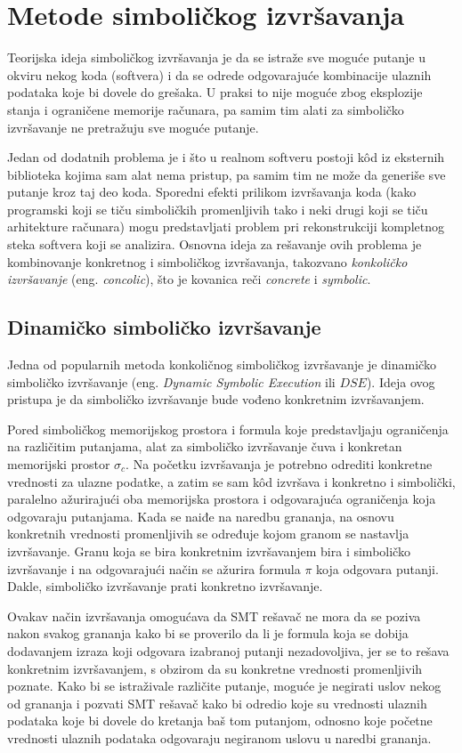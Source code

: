 \documentclass[12pt,oneside]{memoir}
\begin{document}
\section{Metode simboličkog izvršavanja}
Teorijska ideja simboličkog izvršavanja je da se istraže sve moguće putanje u okviru nekog koda (softvera) i da se odrede odgovarajuće kombinacije ulaznih podataka koje bi dovele do grešaka. U praksi to nije moguće zbog eksplozije stanja i ograničene memorije računara, pa samim tim alati za simboličko izvršavanje ne pretražuju sve moguće putanje. 

Jedan od dodatnih problema je i što u realnom softveru postoji k\^od iz eksternih biblioteka kojima sam alat nema pristup, pa samim tim ne može da generiše sve putanje kroz taj deo koda. Sporedni efekti prilikom izvršavanja koda (kako programski koji se tiču simboličkih promenljivih tako i neki drugi koji se tiču arhitekture računara) mogu predstavljati problem pri rekonstrukciji kompletnog steka softvera koji se analizira. Osnovna ideja za rešavanje ovih problema je kombinovanje konkretnog i simboličkog izvršavanja, takozvano \textit{konkoličko izvršavanje} (eng. \textit{concolic}), što je kovanica reči \textit{concrete} i \textit{symbolic}.

\subsection{Dinamičko simboličko izvršavanje}
Jedna od popularnih metoda konkoličnog simboličkog izvršavanje je dinamičko simboličko izvršavanje (eng. \textit{Dynamic Symbolic Execution} ili $DSE$). Ideja ovog pristupa je da simboličko izvršavanje bude vođeno konkretnim izvršavanjem. 

Pored simboličkog memorijskog prostora i formula koje predstavljaju ograničenja na različitim putanjama, alat za simboličko izvršavanje čuva i konkretan memorijski prostor $\sigma_c$. Na početku izvršavanja je potrebno odrediti konkretne vrednosti za ulazne podatke, a zatim se sam k\^od izvršava i konkretno i simbolički, paralelno ažurirajući oba memorijska prostora i odgovarajuća ograničenja koja odgovaraju putanjama. Kada se naiđe na naredbu grananja, na osnovu konkretnih vrednosti promenljivih se određuje kojom granom se nastavlja izvršavanje. Granu koja se bira konkretnim izvršavanjem bira i simboličko izvršavanje i na odgovarajući način se ažurira formula $\pi$ koja odgovara putanji. Dakle, simboličko izvršavanje prati konkretno izvršavanje. 

Ovakav način izvršavanja omogućava da SMT rešavač ne mora da se poziva nakon svakog grananja kako bi se proverilo da li je formula koja se dobija dodavanjem izraza koji odgovara izabranoj putanji nezadovoljiva, jer se to rešava konkretnim izvršavanjem, s obzirom da su konkretne vrednosti promenljivih poznate. Kako bi se istraživale različite putanje, moguće je negirati uslov nekog od grananja i pozvati SMT rešavač kako bi odredio koje su vrednosti ulaznih podataka koje bi dovele do kretanja baš tom putanjom, odnosno koje početne vrednosti ulaznih podataka odgovaraju negiranom uslovu u naredbi grananja. 
\end{document}
